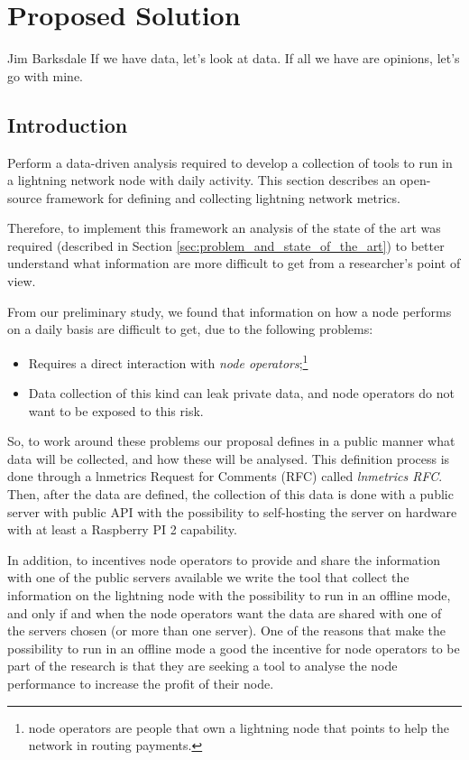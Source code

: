 \chapter{Proposed Solution}

\begin{chapquote}{Jim Barksdale}
If we have data, let’s look at data. If all we have are opinions, let’s go with mine.
\end{chapquote}

\section{Introduction}

Perform a data-driven analysis required to develop a collection of tools
to run in a lightning network node with daily activity. 
This section describes an open-source framework for defining and collecting
lightning network metrics.

Therefore, to implement this framework an analysis of the state 
of the art was required (described in Section \ref{sec:problem_and_state_of_the_art})
to better understand what information are more difficult 
to get from a researcher's point of view.

From our preliminary study, we found that information on how a node performs 
on a daily basis are difficult to get, due to the following problems:
\begin{itemize}
    \item Requires a direct interaction with \emph{node operators};\footnote{node operators are people that own a 
        lightning node that points to help the network in routing payments.}
    \item Data collection of this kind can leak private data, and node operators
        do not want to be exposed to this risk.
\end{itemize}

So, to work around these problems our proposal defines in a 
public manner what data will be collected, and how these will be analysed. This 
definition process is done through a lnmetrics Request for Comments (RFC) 
called \emph{lnmetrics RFC}. Then, after the data are defined, the collection 
of this data is done with a public server with public API with the possibility 
to self-hosting the server on hardware with at least a Raspberry PI 2 capability.

In addition, to incentives node operators to provide and share the 
information with one of the public servers available we write the tool that 
collect the information on the lightning node with the possibility to run 
in an offline mode, and only if and when the node operators want the data 
are shared with one of the servers chosen (or more than one server).
One of the reasons that make the possibility to run in an offline mode a good
the incentive for node operators to be part of the research is that they 
are seeking a tool to analyse the node performance to increase the profit of
their node.

